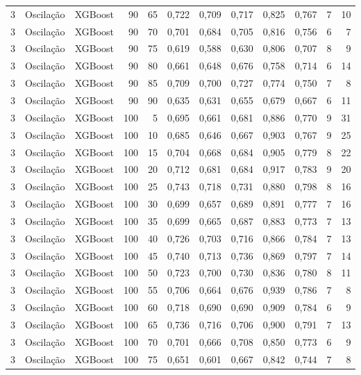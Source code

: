 \begin{longtable}{@{}rllrrrrrrrrr@{}}
3 & Oscilação & XGBoost & 90 & 65 & 0,722 & 0,709 & 0,717 & 0,825 & 0,767 & 7 & 10 \\
3 & Oscilação & XGBoost & 90 & 70 & 0,701 & 0,684 & 0,705 & 0,816 & 0,756 & 6 & 7 \\
3 & Oscilação & XGBoost & 90 & 75 & 0,619 & 0,588 & 0,630 & 0,806 & 0,707 & 8 & 9 \\
3 & Oscilação & XGBoost & 90 & 80 & 0,661 & 0,648 & 0,676 & 0,758 & 0,714 & 6 & 14 \\
3 & Oscilação & XGBoost & 90 & 85 & 0,709 & 0,700 & 0,727 & 0,774 & 0,750 & 7 & 8 \\
3 & Oscilação & XGBoost & 90 & 90 & 0,635 & 0,631 & 0,655 & 0,679 & 0,667 & 6 & 11 \\
3 & Oscilação & XGBoost & 100 & 5 & 0,695 & 0,661 & 0,681 & 0,886 & 0,770 & 9 & 31 \\
3 & Oscilação & XGBoost & 100 & 10 & 0,685 & 0,646 & 0,667 & 0,903 & 0,767 & 9 & 25 \\
3 & Oscilação & XGBoost & 100 & 15 & 0,704 & 0,668 & 0,684 & 0,905 & 0,779 & 8 & 22 \\
3 & Oscilação & XGBoost & 100 & 20 & 0,712 & 0,681 & 0,684 & 0,917 & 0,783 & 9 & 20 \\
3 & Oscilação & XGBoost & 100 & 25 & 0,743 & 0,718 & 0,731 & 0,880 & 0,798 & 8 & 16 \\
3 & Oscilação & XGBoost & 100 & 30 & 0,699 & 0,657 & 0,689 & 0,891 & 0,777 & 7 & 16 \\
3 & Oscilação & XGBoost & 100 & 35 & 0,699 & 0,665 & 0,687 & 0,883 & 0,773 & 7 & 13 \\
3 & Oscilação & XGBoost & 100 & 40 & 0,726 & 0,703 & 0,716 & 0,866 & 0,784 & 7 & 13 \\
3 & Oscilação & XGBoost & 100 & 45 & 0,740 & 0,713 & 0,736 & 0,869 & 0,797 & 7 & 14 \\
3 & Oscilação & XGBoost & 100 & 50 & 0,723 & 0,700 & 0,730 & 0,836 & 0,780 & 8 & 11 \\
3 & Oscilação & XGBoost & 100 & 55 & 0,706 & 0,664 & 0,676 & 0,939 & 0,786 & 7 & 8 \\
3 & Oscilação & XGBoost & 100 & 60 & 0,718 & 0,690 & 0,690 & 0,909 & 0,784 & 6 & 9 \\
3 & Oscilação & XGBoost & 100 & 65 & 0,736 & 0,716 & 0,706 & 0,900 & 0,791 & 7 & 13 \\
3 & Oscilação & XGBoost & 100 & 70 & 0,701 & 0,666 & 0,708 & 0,850 & 0,773 & 6 & 9 \\
3 & Oscilação & XGBoost & 100 & 75 & 0,651 & 0,601 & 0,667 & 0,842 & 0,744 & 7 & 8 \\

\end{longtable}
